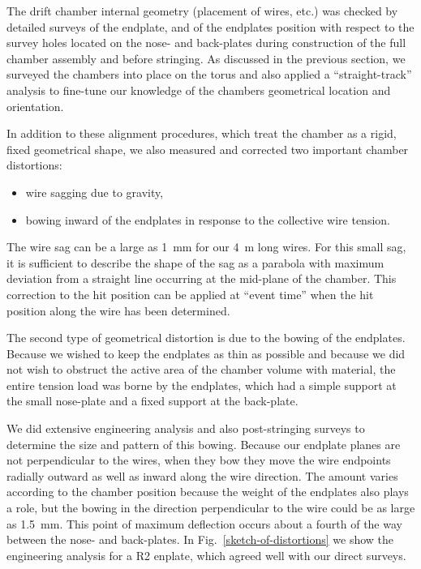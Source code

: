 The drift chamber internal geometry (placement of wires, etc.) was checked by detailed
surveys of the endplate, and of the endplates position with respect to the survey holes
located on the nose- and back-plates during construction of the full chamber assembly
and before stringing.
As discussed in the previous section, we surveyed the chambers into place on the
torus and also applied a ``straight-track'' analysis to fine-tune our knowledge
of the chambers geometrical location and orientation.

In addition to these alignment procedures, which treat the chamber as a rigid, fixed
geometrical shape, we also measured and corrected two important chamber distortions:
\begin{itemize}
\item wire sagging due to gravity,
\item bowing inward of the endplates in response to the collective wire tension.
\end{itemize}

The wire sag can be a large as 1~mm for our 4~m long wires.  For this small
sag, it is sufficient to describe the shape of the sag as a parabola with
maximum deviation from a straight line occurring at the mid-plane of the chamber.
This correction to the hit position can be applied at ``event time'' when the hit position along the wire 
has been determined.

The second type of geometrical distortion is due to the bowing of the endplates.
Because we wished to keep the endplates as thin as possible and because we did
not wish to obstruct the active area of the chamber volume with material, the
entire tension load was borne by the endplates, which had a simple support at the
small nose-plate and a fixed support at the back-plate.

We did extensive engineering analysis and also post-stringing surveys to determine the
size and pattern of this bowing.  Because our endplate planes are not perpendicular to
the wires, when they bow they move the wire endpoints radially outward as well as inward
along the wire direction.  The amount varies
according to the chamber position because the weight of the endplates also plays a role,
but the bowing in the direction perpendicular to the wire could be as large as 1.5~mm.
This point of maximum deflection occurs about a fourth of the way between the nose- and
back-plates.  In Fig.~\ref{sketch-of-distortions} we show the engineering analysis
for a R2 enplate, which agreed well with our direct surveys.

